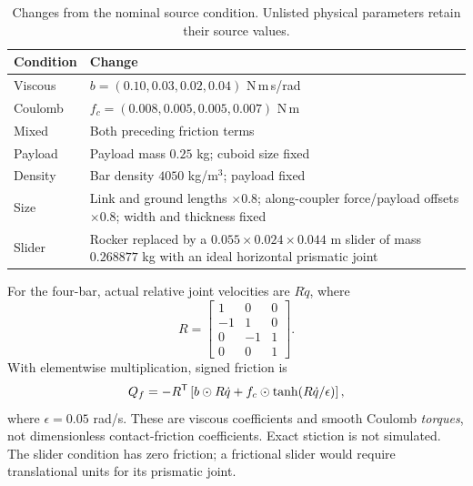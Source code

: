 \documentclass[10pt,twocolumn,letterpaper]{article}
\begin{document}
\begin{table}[t]
\caption{Changes from the nominal source condition. Unlisted physical parameters retain their source values.}
\label{app:conditions}
\centering
\small
\begin{tabular}{lp{}}
\toprule
Condition & Change\\
\midrule
Viscous & $b=(0.10,0.03,0.02,0.04)$ N\,m\,s/rad\\
Coulomb & $f_c=(0.008,0.005,0.005,0.007)$ N\,m\\
Mixed & Both preceding friction terms\\
Payload & Payload mass $0.25$ kg; cuboid size fixed\\
Density & Bar density $4050$ kg/m$^3$; payload fixed\\
Size & Link and ground lengths $\times0.8$; along-coupler force/payload offsets $\times0.8$; width and thickness fixed\\
Slider & Rocker replaced by a $0.055\times0.024\times0.044$ m slider of mass $0.268877$ kg with an ideal horizontal prismatic joint\\
\bottomrule
\end{tabular}
\end{table}

For the four-bar, actual relative joint velocities are $R\dot q$, where
\begin{equation}
R=\begin{bmatrix}
1&0&0\\-1&1&0\\0&-1&1\\0&0&1
\end{bmatrix}.
\end{equation}
With elementwise multiplication, signed friction is
\begin{equation}
Q_f=-R^{\mathsf T}\left[b\odot R\dot q+
f_c\odot\tanh(R\dot q/\epsilon)\right],
\end{equation}
where $\epsilon=0.05$ rad/s. These are viscous coefficients and smooth Coulomb \emph{torques}, not dimensionless contact-friction coefficients. Exact stiction is not simulated. The slider condition has zero friction; a frictional slider would require translational units for its prismatic joint.
\end{document}
